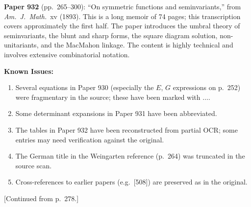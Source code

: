 \documentclass[11pt,a4paper]{book}
\begin{document}
{{{\textbf{Paper 932} (pp.\ 265--300): ``On symmetric functions and seminvariants,''
from \textit{Am.\ J.\ Math.}\ xv (1893). This is a long memoir of 74 pages;
this transcription covers approximately the first half. The paper introduces
the umbral theory of seminvariants, the blunt and sharp forms, the square
diagram solution, non-unitariants, and the MacMahon linkage. The content is
highly technical and involves extensive combinatorial notation.

\textbf{Known Issues:}
\begin{enumerate}
\item Several equations in Paper 930 (especially the $E$, $G$ expressions on p.\ 252)
were fragmentary in the source; these have been marked with $\ldots$.
\item Some determinant expansions in Paper 931 have been abbreviated.
\item The tables in Paper 932 have been reconstructed from partial OCR; some
entries may need verification against the original.
\item The German title in the Weingarten reference (p.\ 264) was truncated in
the source scan.
\item Cross-references to earlier papers (e.g.\ [508]) are preserved as in the original.
\end{enumerate}
\clearpage


\thispagestyle{empty}
\setcounter{page}{279}

\begin{center}
[Continued from p.~278.]
\end{center}

\setcounter{art}{21}

}}}
\end{document}
